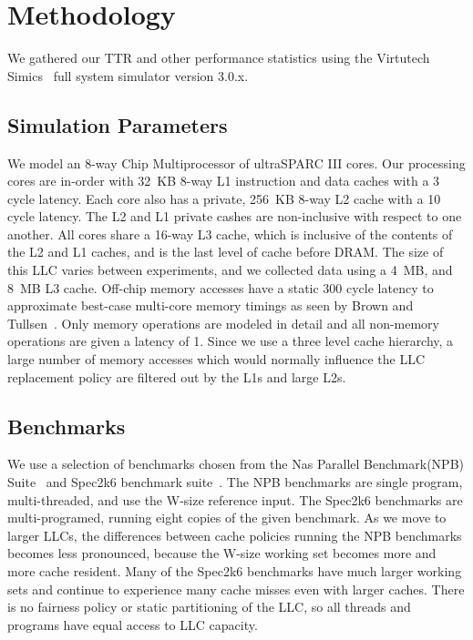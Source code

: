 \section{Methodology}
\label{sec:methodology}

We gathered our TTR and other performance statistics using the
Virtutech Simics~\cite{magnussonchristensson02} full 
system simulator version 3.0.x.  

\subsection{Simulation Parameters}
We model an 8-way Chip Multiprocessor
of ultraSPARC III cores.   Our processing cores
are in-order with 32~KB 8-way L1 instruction and data
caches with a 3 cycle latency.  Each core also has a private, 256~KB
8-way L2 cache with a 10 cycle latency.  The L2 and L1 private cashes
are non-inclusive with respect to one another.  All cores share a 16-way L3
cache, which is inclusive of the contents of the L2 and L1 caches, and
is the last level of cache before DRAM.  The size of this LLC varies
between experiments, and we collected data using a 4~MB, and 8~MB L3
cache.  Off-chip memory accesses have a static 300 cycle 
latency to approximate best-case multi-core memory timings as seen by
Brown and Tullsen~\cite{browntullsen08}.  Only memory operations are
modeled in detail and all non-memory operations are given a latency of
1.  Since we use a three level cache hierarchy, a large number of
memory accesses which would normally influence the LLC replacement policy are
filtered out by the L1s and large L2s.

\subsection{Benchmarks}

We use a selection of benchmarks chosen from the Nas Parallel
Benchmark(NPB)  Suite~\cite{NPB94} and Spec2k6 benchmark
suite~\cite{henning05}.  The NPB benchmarks are single
program, multi-threaded, and use the W-size reference input.  The Spec2k6 benchmarks are
multi-programed, running eight copies of the given benchmark.  As we
move to larger LLCs, the differences between cache policies
running  the NPB benchmarks
becomes less pronounced, because the W-size working set becomes more
and more cache resident.  Many of the Spec2k6 benchmarks have much
larger working sets and  continue to
experience many cache misses even with larger caches.  There is
no fairness policy or static partitioning of the LLC, so all threads
and programs have equal access to LLC capacity.

